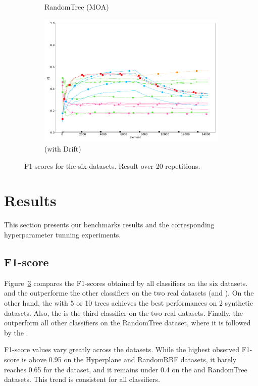 \begin{figure}
\begin{subfigure}[t]{.49\linewidth}
		\caption{RandomTree (MOA)}
		\label{fig:f1-dataset_3}
	\end{subfigure}
	\hfill
	\begin{subfigure}[t]{.49\linewidth}
		\includegraphics[width=\linewidth]{figures/results/drift_3_f1.png}
		\caption{\banosdataset (with Drift)}
		\label{fig:f1-drift}
	\end{subfigure}
	\caption{F1-scores for the six datasets. Result over 20 repetitions.}
	\label{fig:f1}
\end{figure}

\section{Results}
This section presents our benchmarks results and the corresponding
hyperparameter tunning experiments.

\subsection{F1-score}
Figure~\ref{fig:f1} compares the F1-scores obtained by all classifiers on the
six datasets.  \naivebayes and the \hoeffdingtree outperforme the other
classifiers on the two real datasets (\banosdataset and \recofitdataset).  On
the other hand, the \mondrianforest with 5 or 10 trees achieves the best
performances on 2 synthetic datasets.  Also, the \mondrianforest is the third
classifier on the two real datasets.  Finally, the \hoeffdingtree outperform
all other classifiers on the RandomTree dataset, where it is followed by the
\mondrianforest.

F1-score values vary greatly across the datasets.  While the highest
observed F1-score is above 0.95 on the Hyperplane and RandomRBF datasets,
it barely reaches 0.65 for the \banosdataset dataset, and it remains under
0.4 on the \recofitdataset and RandomTree datasets. This trend is
consistent for all classifiers.

